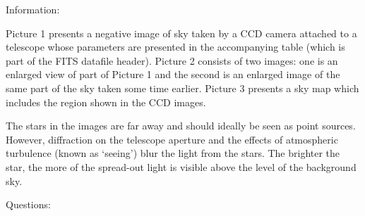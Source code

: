 Information:

Picture 1 presents a negative image of sky taken by a CCD camera attached to
a telescope whose parameters are presented in the accompanying table (which
is part of the FITS datafile header). Picture 2 consists of two images: one
is an enlarged view of part of Picture 1 and the second is an enlarged image
of the same part of the sky taken some time earlier. Picture 3 presents a
sky map which includes the region shown in the CCD images.

The stars in the images are far away and should ideally be seen as point
sources. However, diffraction on the telescope aperture and the effects of
atmospheric turbulence (known as `seeing') blur the light from the stars.
The brighter the star, the more of the spread-out light is visible above the
level of the background sky.

Questions:

